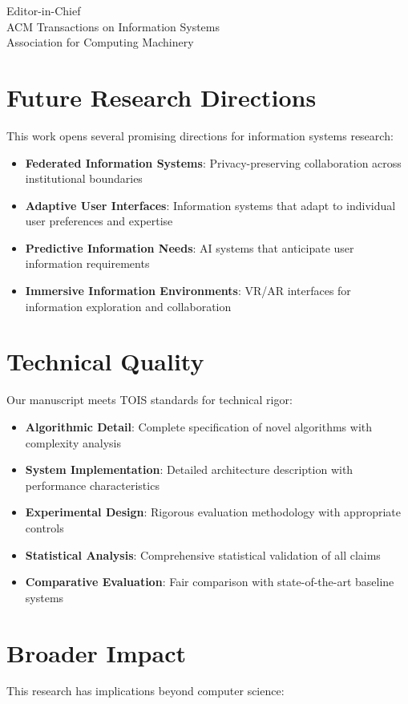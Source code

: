 \documentclass[11pt]{letter}
\begin{document}
\begin{letter}{Editor-in-Chief\\
ACM Transactions on Information Systems\\
Association for Computing Machinery}
\section*{Future Research Directions}

This work opens several promising directions for information systems research:

\begin{itemize}
    \item \textbf{Federated Information Systems}: Privacy-preserving collaboration across institutional boundaries
    \item \textbf{Adaptive User Interfaces}: Information systems that adapt to individual user preferences and expertise
    \item \textbf{Predictive Information Needs}: AI systems that anticipate user information requirements
    \item \textbf{Immersive Information Environments}: VR/AR interfaces for information exploration and collaboration
\end{itemize}

\section*{Technical Quality}

Our manuscript meets TOIS standards for technical rigor:

\begin{itemize}
    \item \textbf{Algorithmic Detail}: Complete specification of novel algorithms with complexity analysis
    \item \textbf{System Implementation}: Detailed architecture description with performance characteristics
    \item \textbf{Experimental Design}: Rigorous evaluation methodology with appropriate controls
    \item \textbf{Statistical Analysis}: Comprehensive statistical validation of all claims
    \item \textbf{Comparative Evaluation}: Fair comparison with state-of-the-art baseline systems
\end{itemize}

\section*{Broader Impact}

This research has implications beyond computer science:


\end{letter}
\end{document}

